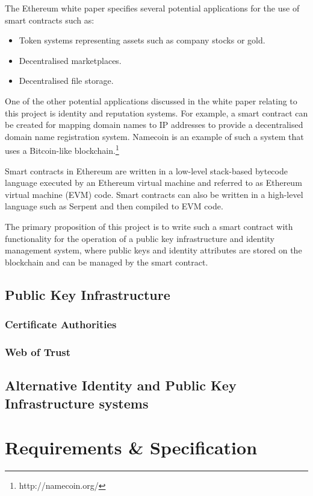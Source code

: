 \documentclass[12pt,a4paper]{report}
\begin{document}
	The Ethereum white paper specifies several potential applications for the use of smart contracts such as:
	\begin{itemize}
		\item Token systems representing assets such as company stocks or gold.
		\item Decentralised marketplaces.
		\item Decentralised file storage.
	\end{itemize}
	
	One of the other potential applications discussed in the white paper relating to this project is identity and reputation systems. For example, a smart contract can be created for mapping domain names to IP addresses to provide a decentralised domain name registration system. Namecoin is an example of such a system that uses a Bitcoin-like blockchain.\footnote{http://namecoin.org/}
	
	Smart contracts in Ethereum are written in a low-level stack-based bytecode language executed by an Ethereum virtual machine and referred to as Ethereum virtual machine (EVM) code. Smart contracts can also be written in a high-level language such as Serpent and then compiled to EVM code.\cite{3}
	
	The primary proposition of this project is to write such a smart contract with functionality for the operation of a public key infrastructure and identity management system, where public keys and identity attributes are stored on the blockchain and can be managed by the smart contract.
	
	\section{Public Key Infrastructure}
		
	
	\subsection{Certificate Authorities}
	\subsection{Web of Trust}
	\section{Alternative Identity and Public Key Infrastructure systems}
	
	\chapter{Requirements \& Specification}
\end{document}
